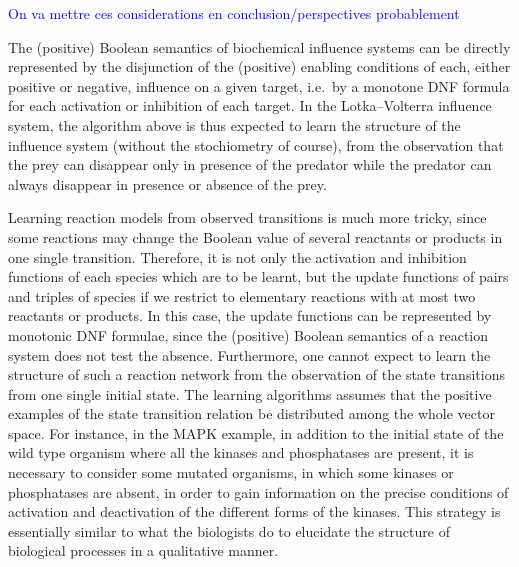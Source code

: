 \documentclass{llncs}
\newcommand{\francois}[1]{\textcolor{blue}{#1}}
\begin{document}
\francois{On va mettre ces considerations en conclusion/perspectives probablement}

The (positive) Boolean semantics of biochemical influence systems
can be directly represented by the disjunction of the (positive) enabling conditions of each, either positive or negative, influence on a given target,
i.e.~by a monotone DNF formula for each activation or inhibition of each target.
In the Lotka--Volterra influence system, the algorithm above is thus expected to learn the structure of the influence system
(without the stochiometry of course),
from the observation that the prey can disappear only in presence of the predator
while the predator can always disappear in presence or absence of the prey.

  Learning reaction models from observed transitions is much more tricky,
  since some reactions may change the Boolean value of several reactants or products in one single transition.
  Therefore, it is not only the activation and inhibition functions of each species which are to be learnt,
  but the update functions of pairs and triples of species if we restrict to elementary reactions with at most two reactants or products.
  In this case, the update functions can be represented by monotonic DNF formulae, since the (positive) Boolean semantics of a reaction system does not test the absence.
Furthermore,   one cannot expect to learn the structure of such a reaction network
from the observation of the state transitions from one single initial state.
The learning algorithms assumes that the positive examples of the state transition relation be distributed
among the whole vector space.
For instance, in the MAPK example, in addition to the initial state of the wild type organism where all the kinases and phosphatases are present,
it is necessary to consider some mutated organisms, in which some kinases or phosphatases are absent,
in order to gain information on the precise conditions of activation and deactivation of the different forms of the kinases.
This strategy is essentially similar to what the biologists do to elucidate the structure of biological processes
in a qualitative manner.
\end{document}
